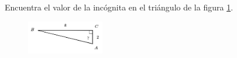 \question[15]  Encuentra el valor de la incógnita en el triángulo de la figura \ref{fig:angle_functrig_27}.
\begin{figure}[H]
    \begin{center}
        \includegraphics[width=0.3\textwidth]{../images/angle_functrig_27.png}
    \end{center}
    \caption{}
    \label{fig:angle_functrig_27}
\end{figure}
